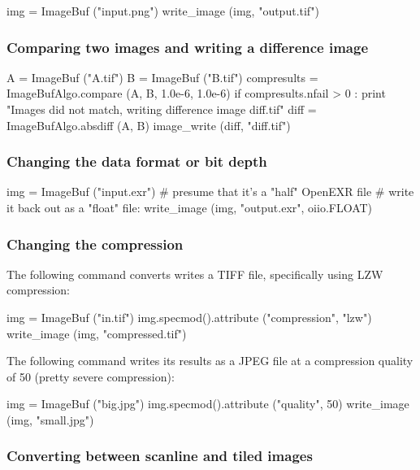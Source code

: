 \begin{code}
    img = ImageBuf ("input.png")
    write_image (img, "output.tif")
\end{code}


\subsubsection*{Comparing two images and writing a difference image}

\begin{code}
    A = ImageBuf ("A.tif")
    B = ImageBuf ("B.tif")
    compresults = ImageBufAlgo.compare (A, B, 1.0e-6, 1.0e-6)
    if compresults.nfail > 0 :
        print "Images did not match, writing difference image diff.tif"
        diff = ImageBufAlgo.absdiff (A, B)
        image_write (diff, "diff.tif")
\end{code}


\subsubsection*{Changing the data format or bit depth}

\begin{code}
    img = ImageBuf ("input.exr")
    # presume that it's a "half" OpenEXR file
    # write it back out as a "float" file:
    write_image (img, "output.exr", oiio.FLOAT)
\end{code}


\subsubsection*{Changing the compression}

The following command converts writes a TIFF file, specifically using
LZW compression:

\begin{code}
    img = ImageBuf ("in.tif")
    img.specmod().attribute ("compression", "lzw")
    write_image (img, "compressed.tif")
\end{code}

The following command writes its results as a JPEG file at a 
compression quality of 50 (pretty severe compression):

\begin{code}
    img = ImageBuf ("big.jpg")
    img.specmod().attribute ("quality", 50)
    write_image (img, "small.jpg")
\end{code}


\subsubsection*{Converting between scanline and tiled images}

